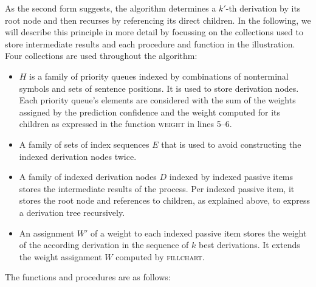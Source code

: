 \documentclass[../../document.tex]{subfiles}
\begin{document}
    As the second form suggests, the algorithm determines a \(k'\)-th derivation by its root node and then recurses by referencing its direct children.
    In the following, we will describe this principle in more detail by focussing on the collections used to store intermediate results and each procedure and function in the illustration.
    Four collections are used throughout the algorithm:
    \begin{itemize}
        \item \(H\) is a family of priority queues indexed by combinations of nonterminal symbols and sets of sentence positions. It is used to store derivation nodes.
            Each priority queue's elements are considered with the sum of the weights assigned by the prediction confidence and the weight computed for its children as expressed in the function \textsc{weight} in lines 5--6.
        \item A family of sets of index sequences \(E\) that is used to avoid constructing the indexed derivation nodes twice.
        \item A family of indexed derivation nodes \(D\) indexed by indexed passive items stores the intermediate results of the process.
            Per indexed passive item, it stores the root node and references to children, as explained above, to express a derivation tree recursively.
        \item An assignment \(W'\) of a weight to each indexed passive item stores the weight of the according derivation in the sequence of $k$ best derivations.
            It extends the weight assignment \(W\) computed by \textsc{fillchart}.
    \end{itemize}
    The functions and procedures are as follows:
\end{document}
